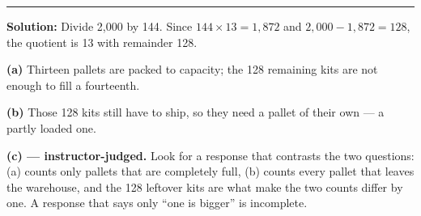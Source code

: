 \documentclass[12pt]{article}
\begin{document}
\vspace{0.2cm}\noindent\rule{\linewidth}{0.2pt}\vspace{0.2cm}


\textbf{Solution:} Divide 2{,}000 by 144. Since $144 \times 13 = 1{,}872$ and $2{,}000 - 1{,}872 = 128$, the quotient is 13 with remainder 128.

\textbf{(a)} Thirteen pallets are packed to capacity; the 128 remaining kits are not enough to fill a fourteenth. 

\textbf{(b)} Those 128 kits still have to ship, so they need a pallet of their own --- a partly loaded one. 

\textbf{(c) --- instructor-judged.} Look for a response that contrasts the two questions: (a) counts only pallets that are completely full, (b) counts every pallet that leaves the warehouse, and the 128 leftover kits are what make the two counts differ by one. A response that says only ``one is bigger'' is incomplete.
\end{document}
